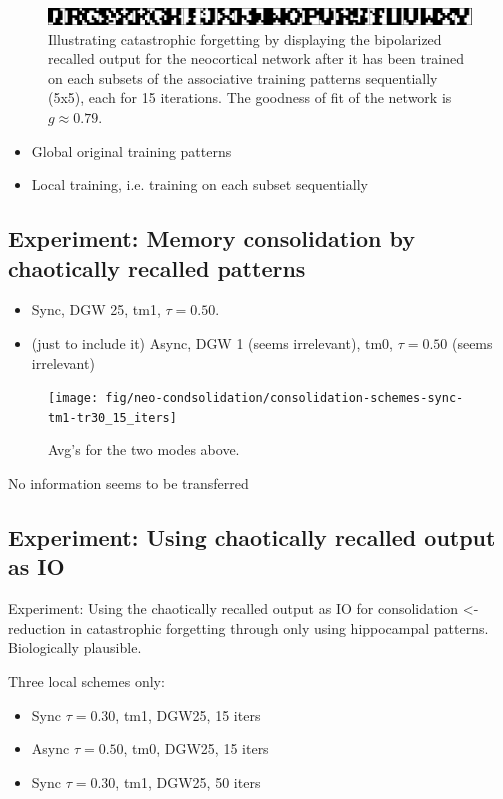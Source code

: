 \begin{figure}
    \centering
    \includegraphics[width=12cm]{fig/neo-intro-demo/local_aggregate_im}
    \caption{Illustrating catastrophic forgetting by displaying the bipolarized recalled output for the neocortical network after it has been trained on each subsets of the associative training patterns sequentially (5x5), each for 15 iterations. The goodness of fit of the network is $g\approx0.79$.}
    \label{fig:local_aggregate_im}
\end{figure}

\begin{itemize}
    \item Global original training patterns
    \item Local training, i.e. training on each subset sequentially
\end{itemize}

\subsection{Experiment: Memory consolidation by chaotically recalled patterns}

\begin{itemize}
    \item Sync, DGW 25, tm1, $\tau=0.50$.
    \item (just to include it) Async, DGW 1 (seems irrelevant), tm0, $\tau=0.50$ (seems irrelevant)
\end{itemize}

\begin{figure}
    \centering
    \texttt{[image: fig/neo-condsolidation/consolidation-schemes-sync-tm1-tr30\_15\_iters]}
    \caption{Avg's for the two modes above. }
    \label{fig:my_label}
\end{figure}

No information seems to be transferred

\subsection{Experiment: Using chaotically recalled output as IO}

Experiment: Using the chaotically recalled output as IO for consolidation <- reduction in catastrophic forgetting through only using hippocampal patterns. Biologically plausible.

Three local schemes only:
\begin{itemize}
    \item Sync $\tau=0.30$, tm1, DGW25, 15 iters
    \item Async $\tau=0.50$, tm0, DGW25, 15 iters
    \item Sync $\tau=0.30$, tm1, DGW25, 50 iters
\end{itemize}

